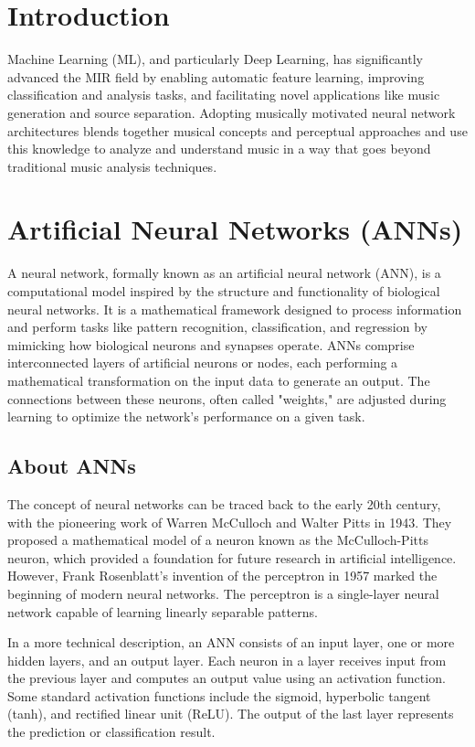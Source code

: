 \section{Introduction}
Machine Learning (ML), and particularly Deep Learning, has significantly advanced the MIR field by enabling automatic feature learning, improving classification and analysis tasks, and facilitating novel applications like music generation and source separation. Adopting musically motivated neural network architectures \cite{musicmotivCNN} blends together musical concepts and perceptual approaches and use this knowledge to analyze and understand music in a way that goes beyond traditional music analysis techniques. 

\section{Artificial Neural Networks (ANNs)}
A neural network, formally known as an artificial neural network (ANN), is a computational model inspired by the structure and functionality of biological neural networks. It is a mathematical framework designed to process information and perform tasks like pattern recognition, classification, and regression by mimicking how biological neurons and synapses operate. ANNs comprise interconnected layers of artificial neurons or nodes, each performing a mathematical transformation on the input data to generate an output. The connections between these neurons, often called "weights," are adjusted during learning to optimize the network's performance on a given task.

\subsection{About ANNs}
The concept of neural networks can be traced back to the early 20th century, with the pioneering work of Warren McCulloch and Walter Pitts in 1943. They proposed a mathematical model of a neuron known as the McCulloch-Pitts neuron, which provided a foundation for future research in artificial intelligence. However, Frank Rosenblatt's invention of the perceptron in 1957 marked the beginning of modern neural networks. The perceptron is a single-layer neural network capable of learning linearly separable patterns.



In a more technical description, an ANN consists of an input layer, one or more hidden layers, and an output layer. Each neuron in a layer receives input from the previous layer and computes an output value using an activation function. Some standard activation functions include the sigmoid, hyperbolic tangent (tanh), and rectified linear unit (ReLU). The output of the last layer represents the prediction or classification result.

